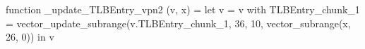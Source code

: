 function _update_TLBEntry_vpn2 (v, x) = let v = { v with TLBEntry_chunk_1 = vector_update_subrange(v.TLBEntry_chunk_1, 36, 10, vector_subrange(x, 26, 0)) } in v

